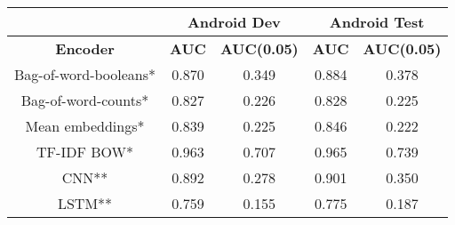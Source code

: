 \documentclass[12pt]{article}
\begin{document}
\begin{center}
		~\\~\\
		\begin{tabular}{|c||c|c||c|c|}
			\hline
			\cellcolor{gray!15}
				& \multicolumn{2}{c||}{\cellcolor{gray!15}Android Dev}
				& \multicolumn{2}{c|}{\cellcolor{gray!15}Android Test} \\ \hline
			\cellcolor{gray!15}\textbf{Encoder}
				& \cellcolor{gray!15}\textbf{AUC} & \cellcolor{gray!15}\textbf{AUC(0.05)}
				& \cellcolor{gray!15}\textbf{AUC} & \cellcolor{gray!15}\textbf{AUC(0.05)} \\ \hline\hline
			\cellcolor{red!15}Bag-of-word-booleans* & 0.870 & 0.349 & 0.884 & 0.378 \\ \hline
			\cellcolor{red!15}Bag-of-word-counts* & 0.827 & 0.226 & 0.828 & 0.225 \\ \hline
			\cellcolor{red!15}Mean embeddings* & 0.839 & 0.225 & 0.846 & 0.222 \\ \hline
			\cellcolor{red!15}TF-IDF BOW* & 0.963 & 0.707 & 0.965 & 0.739 \\ \hline\hline
			\cellcolor{green!15}CNN** & 0.892 & 0.278 & 0.901 & 0.350 \\ \hline
			\cellcolor{green!15}LSTM** & 0.759 & 0.155 & 0.775 & 0.187 \\ \hline
		\end{tabular}

\end{center}
\end{document}
